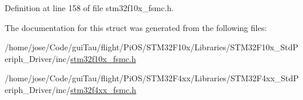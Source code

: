 Definition at line 158 of file stm32f10x\-\_\-fsmc.\-h.



The documentation for this struct was generated from the following files\-:\begin{DoxyCompactItemize}
\item 
/home/jose/\-Code/gui\-Tau/flight/\-Pi\-O\-S/\-S\-T\-M32\-F10x/\-Libraries/\-S\-T\-M32\-F10x\-\_\-\-Std\-Periph\-\_\-\-Driver/inc/\hyperlink{stm32f10x__fsmc_8h}{stm32f10x\-\_\-fsmc.\-h}\item 
/home/jose/\-Code/gui\-Tau/flight/\-Pi\-O\-S/\-S\-T\-M32\-F4xx/\-Libraries/\-S\-T\-M32\-F4xx\-\_\-\-Std\-Periph\-\_\-\-Driver/inc/\hyperlink{stm32f4xx__fsmc_8h}{stm32f4xx\-\_\-fsmc.\-h}\end{DoxyCompactItemize}
